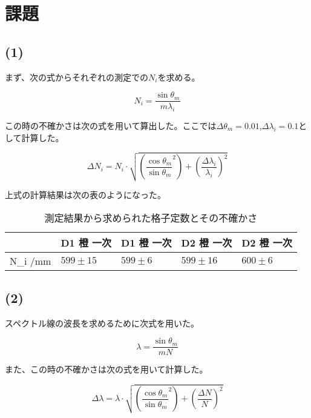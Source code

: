 \documentclass{jsarticle}
\begin{document}
\section{課題}

\subsection{(1)}

まず、次の式からそれぞれの測定での$N_i$を求める。

\begin{equation}
    N_i = \frac{\sin{\theta_m}}{m\lambda_i}
\end{equation}

この時の不確かさは次の式を用いて算出した。ここでは$\Delta \theta_m = 0.01$,$\Delta \lambda_i = 0.1$として計算した。

\begin{equation}
    \Delta N_i = N_i\cdot\sqrt{(\frac{\cos{\theta_m}}{\sin{\theta_m}}^2) + (\frac{\Delta\lambda_i}{\lambda_i})^2}
\end{equation}

上式の計算結果は次の表のようになった。

\begin{table}[H]
\centering
\caption{測定結果から求められた格子定数とその不確かさ}
\label{my-label}
\begin{tabular}{|l|l|l|l|l|}
\hline
         & D1 橙 一次 & D1 橙 一次 & D2 橙 一次 & D2 橙 一次 \\ \hline
N\_i /mm & $599 \pm 15$     & $599 \pm 6$     & $599 \pm 16$     & $600 \pm 6$     \\ \hline
\end{tabular}
\end{table}

\subsection{(2)}

スペクトル線の波長を求めるために次式を用いた。

\begin{equation}
    \lambda = \frac{\sin{\theta_m}}{mN}
\end{equation}

また、この時の不確かさは次の式を用いて計算した。

\begin{equation}
    \Delta \lambda = \lambda\cdot\sqrt{(\frac{\cos{\theta_m}}{\sin{\theta_m}}^2) + (\frac{\Delta N}{N})^2}
\end{equation}
\end{document}
